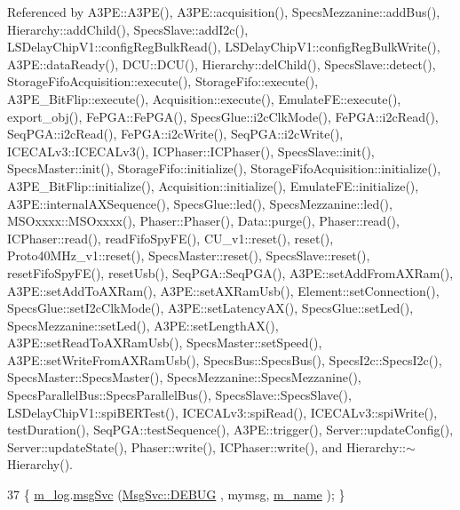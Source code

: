 Referenced by A3\+P\+E\+::\+A3\+P\+E(), A3\+P\+E\+::acquisition(), Specs\+Mezzanine\+::add\+Bus(), Hierarchy\+::add\+Child(), Specs\+Slave\+::add\+I2c(), L\+S\+Delay\+Chip\+V1\+::config\+Reg\+Bulk\+Read(), L\+S\+Delay\+Chip\+V1\+::config\+Reg\+Bulk\+Write(), A3\+P\+E\+::data\+Ready(), D\+C\+U\+::\+D\+C\+U(), Hierarchy\+::del\+Child(), Specs\+Slave\+::detect(), Storage\+Fifo\+Acquisition\+::execute(), Storage\+Fifo\+::execute(), A3\+P\+E\+\_\+\+Bit\+Flip\+::execute(), Acquisition\+::execute(), Emulate\+F\+E\+::execute(), export\+\_\+obj(), Fe\+P\+G\+A\+::\+Fe\+P\+G\+A(), Specs\+Glue\+::i2c\+Clk\+Mode(), Fe\+P\+G\+A\+::i2c\+Read(), Seq\+P\+G\+A\+::i2c\+Read(), Fe\+P\+G\+A\+::i2c\+Write(), Seq\+P\+G\+A\+::i2c\+Write(), I\+C\+E\+C\+A\+Lv3\+::\+I\+C\+E\+C\+A\+Lv3(), I\+C\+Phaser\+::\+I\+C\+Phaser(), Specs\+Slave\+::init(), Specs\+Master\+::init(), Storage\+Fifo\+::initialize(), Storage\+Fifo\+Acquisition\+::initialize(), A3\+P\+E\+\_\+\+Bit\+Flip\+::initialize(), Acquisition\+::initialize(), Emulate\+F\+E\+::initialize(), A3\+P\+E\+::internal\+A\+X\+Sequence(), Specs\+Glue\+::led(), Specs\+Mezzanine\+::led(), M\+S\+Oxxxx\+::\+M\+S\+Oxxxx(), Phaser\+::\+Phaser(), Data\+::purge(), Phaser\+::read(), I\+C\+Phaser\+::read(), read\+Fifo\+Spy\+F\+E(), C\+U\+\_\+v1\+::reset(), reset(), Proto40\+M\+Hz\+\_\+v1\+::reset(), Specs\+Master\+::reset(), Specs\+Slave\+::reset(), reset\+Fifo\+Spy\+F\+E(), reset\+Usb(), Seq\+P\+G\+A\+::\+Seq\+P\+G\+A(), A3\+P\+E\+::set\+Add\+From\+A\+X\+Ram(), A3\+P\+E\+::set\+Add\+To\+A\+X\+Ram(), A3\+P\+E\+::set\+A\+X\+Ram\+Usb(), Element\+::set\+Connection(), Specs\+Glue\+::set\+I2c\+Clk\+Mode(), A3\+P\+E\+::set\+Latency\+A\+X(), Specs\+Glue\+::set\+Led(), Specs\+Mezzanine\+::set\+Led(), A3\+P\+E\+::set\+Length\+A\+X(), A3\+P\+E\+::set\+Read\+To\+A\+X\+Ram\+Usb(), Specs\+Master\+::set\+Speed(), A3\+P\+E\+::set\+Write\+From\+A\+X\+Ram\+Usb(), Specs\+Bus\+::\+Specs\+Bus(), Specs\+I2c\+::\+Specs\+I2c(), Specs\+Master\+::\+Specs\+Master(), Specs\+Mezzanine\+::\+Specs\+Mezzanine(), Specs\+Parallel\+Bus\+::\+Specs\+Parallel\+Bus(), Specs\+Slave\+::\+Specs\+Slave(), L\+S\+Delay\+Chip\+V1\+::spi\+B\+E\+R\+Test(), I\+C\+E\+C\+A\+Lv3\+::spi\+Read(), I\+C\+E\+C\+A\+Lv3\+::spi\+Write(), test\+Duration(), Seq\+P\+G\+A\+::test\+Sequence(), A3\+P\+E\+::trigger(), Server\+::update\+Config(), Server\+::update\+State(), Phaser\+::write(), I\+C\+Phaser\+::write(), and Hierarchy\+::$\sim$\+Hierarchy().


\begin{DoxyCode}
37 \{ \hyperlink{classObject_a0d269813dd7ac1f24bc143031e2963f2}{m\_log}.\hyperlink{classMsgSvc_ad25f18047920cc59a314e5098259711c}{msgSvc} (\hyperlink{classMsgSvc_ae671eb7301996cd049d2da8a65925926a1dbdcc82dce88370ec335883c83b38b0}{MsgSvc::DEBUG}   , mymsg, \hyperlink{classObject_a8b83c95c705d2c3ba0d081fe1710f48d}{m\_name} ); \}
\end{DoxyCode}
\mbox{\label{classObject_a6c9a0397ca804e04d675ed05683f5420}} 
